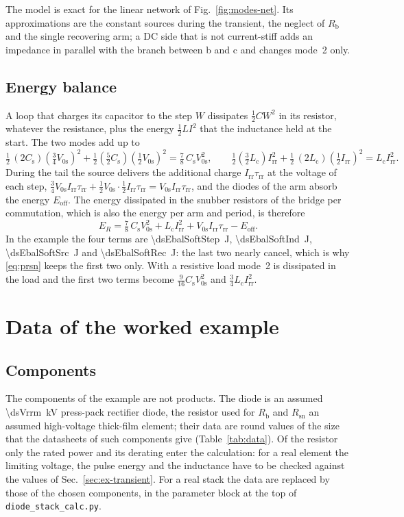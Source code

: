 \documentclass[10pt,a4paper]{scrartcl}
\newcommand{\Irr}{I_\mathrm{rr}}
\newcommand{\Rsn}{R_\mathrm{sn}}
\newcommand{\Rb}{R_\mathrm{b}}
\newcommand{\Cs}{C_\mathrm{s}}
\newcommand{\Lc}{L_\mathrm{c}}
\newcommand{\Vos}{V_\mathrm{0s}}
\newcommand{\trr}{\tau_\mathrm{rr}}
\begin{document}
The model is exact for the linear network of Fig.~\ref{fig:modes-net}. Its approximations are the constant sources during the transient, the neglect of $\Rb$ and the single recovering arm; a DC side that is not current-stiff adds an impedance in parallel with the branch between b and c and changes mode~2 only.

\subsection{Energy balance}
A loop that charges its capacitor to the step $W$ dissipates $\tfrac12CW^2$ in its resistor, whatever the resistance, plus the energy $\tfrac12LI^2$ that the inductance held at the start. The two modes add up to
\begin{equation*}
\tfrac12\,(2\Cs)\left(\tfrac34\Vos\right)^2 + \tfrac12\left(\tfrac52\Cs\right)\left(\tfrac12\Vos\right)^2 = \tfrac78\,\Cs\Vos^2, \qquad
\tfrac12\left(\tfrac32\Lc\right)\Irr^2 + \tfrac12\,(2\Lc)\left(\tfrac12\Irr\right)^2 = \Lc\Irr^2 .
\end{equation*}
During the tail the source delivers the additional charge $\Irr\trr$ at the voltage of each step, $\tfrac34\Vos\Irr\trr + \tfrac12\Vos\cdot\tfrac12\Irr\trr = \Vos\Irr\trr$, and the diodes of the arm absorb the energy $E_\mathrm{off}$. The energy dissipated in the snubber resistors of the bridge per commutation, which is also the energy per arm and period, is therefore
\begin{equation}
E_R = \tfrac78\,\Cs\Vos^2 + \Lc\Irr^2 + \Vos\Irr\trr - E_\mathrm{off} .
\label{eq:ebal}
\end{equation}
In the example the four terms are \SI{\dsEbalSoftStep}{\joule}, \SI{\dsEbalSoftInd}{\joule}, \SI{\dsEbalSoftSrc}{\joule} and \SI{\dsEbalSoftRec}{\joule}: the last two nearly cancel, which is why \eqref{eq:prsn} keeps the first two only. With a resistive load mode~2 is dissipated in the load and the first two terms become $\tfrac9{16}\Cs\Vos^2$ and $\tfrac34\Lc\Irr^2$.

\section{Data of the worked example}
\label{app:data}
\subsection{Components}
The components of the example are not products. The diode is an assumed \SI{\dsVrrm}{\kilo\volt} press-pack rectifier diode, the resistor used for $\Rb$ and $\Rsn$ an assumed high-voltage thick-film element; their data are round values of the size that the datasheets of such components give (Table~\ref{tab:data}). Of the resistor only the rated power and its derating enter the calculation: for a real element the limiting voltage, the pulse energy and the inductance have to be checked against the values of Sec.~\ref{sec:ex-transient}. For a real stack the data are replaced by those of the chosen components, in the parameter block at the top of \texttt{diode\_stack\_calc.py}.
\end{document}
